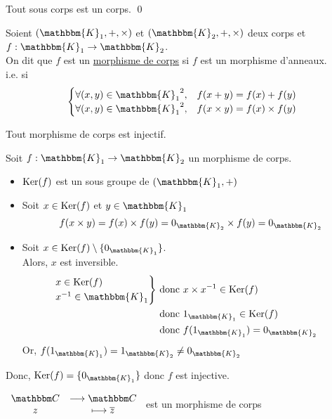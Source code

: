 \begin{prop}
	Tout sous corps est un corps. \qed
\end{prop}

\begin{defn}
	Soient $(\mathbbm{K}_1,+,\times )$ et $(\mathbbm{K}_2,+, \times)$ deux corps et $f: \mathbbm{K}_1 \to \mathbbm{K}_2$.\\
	On dit que $f$ est un \underline{morphisme de corps} si $f$ est un morphisme d'anneaux.\\
	i.e. si
	\[
		\begin{cases}
			\forall (x,y) \in {\mathbbm{K}_1}^2,& f(x+y) = f(x) + f(y)\\
			\forall (x,y) \in {\mathbbm{K}_1}^2,& f(x \times y) = f(x) \times f(y)\\
		\end{cases}
	\] 
\end{defn}

\begin{prop}
	Tout morphisme de corps est injectif.
\end{prop}

\begin{prv}
	Soit $f: \mathbbm{K}_1 \to \mathbbm{K}_2$ un morphisme de corps.\\
	\begin{itemize}
		\item $\operatorname{Ker}(f)$ est un sous groupe de $(\mathbbm{K}_1, +)$ 
		\item Soit $x \in \operatorname{Ker}(f)$ et $y \in \mathbbm{K}_1$ \[
				f(x \times y) = f(x) \times f(y) = 0_{\mathbbm{K}_2} \times f(y) = 0_{\mathbbm{K}_2}
			\]
		\item Soit $x \in \Ker(f) \setminus \{0_{\mathbbm{K}_1}\}$.\\
			Alors, $x$ est inversible.\\
			\begin{align*}
				\begin{rcases*}
					x \in \Ker(f)\\
					x^{-1} \in \mathbbm{K}_1
				\end{rcases*}& \text{ donc } x \times x ^{-1} \in \Ker(f)\\
				&\text{ donc } 1_{\mathbbm{K}_1} \in \Ker(f)\\
				&\text{ donc } f(1_{\mathbbm{K}_1}) = 0_{\mathbbm{K}_2}
			\end{align*}
			Or, $f(1_{\mathbbm{K}_1}) = 1_{\mathbbm{K}_2} \neq 0_{\mathbbm{K}_2}$
	\end{itemize}
	Donc, $\Ker(f) = \{0_{\mathbbm{K}_1}\}$ donc $f$ est injective.
\end{prv}

\begin{exm}
	$\begin{array}{cc}
		\C &\longrightarrow \C\\
		z &\longmapsto \overline{z}\\
	\end{array}$ est un morphisme de corps
\end{exm}


